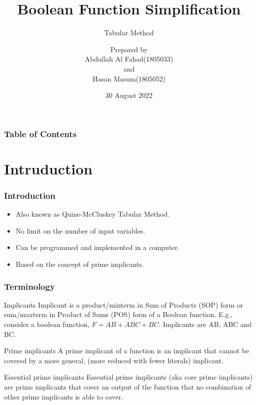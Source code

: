 \documentclass{beamer}
\title[Tabular method] %
{Boolean Function Simplification}
\subtitle{Tabular Method}
\author[Fahad, Masum] %
{
    Prepared by\\
    Abdullah Al Fahad(1805033)\\
    and\\
    Hasan Masum(1805052)
}
\date[30/08/2022] %
{30 August 2022}
\begin{document}
\frame{\titlepage}
\logo{}

\begin{frame}
    \frametitle{Table of Contents}
    \tableofcontents
\end{frame}


\section{Intruduction}

\begin{frame}
    \frametitle{Introduction}
    \begin{itemize}
        \item<1-> Also known as Quine-McCluskey Tabular Method.
        \item<2-> No limit on the number of input variables.
        \item<3-> Can be programmed and implemented in a computer.
        \item<4-> Based on the concept of prime implicants.
    \end{itemize}
\end{frame}

\begin{frame}
    \frametitle{Terminology}
    \begin{footnotesize}
            \begin{alertblock}{Implicants}
        Implicant is a product/minterm in Sum of Products (SOP) form or sum/maxterm in Product of Sums (POS) form of a Boolean function. E.g., consider a boolean function, $F = AB + ABC + BC.$ Implicants are AB, ABC and BC.
    \end{alertblock} \pause
    \begin{alertblock}{Prime implicants}
        A prime implicant of a function is an implicant that cannot be covered by a more general, (more reduced with fewer literals) implicant.
    \end{alertblock} \pause
    \begin{alertblock}{Essential prime implicants}
        Essential prime implicants (aka core prime implicants) are prime implicants that cover an output of the function that no combination of other prime implicants is able to cover.
    \end{alertblock}
    \end{footnotesize}
    
\end{frame}
\end{document}
